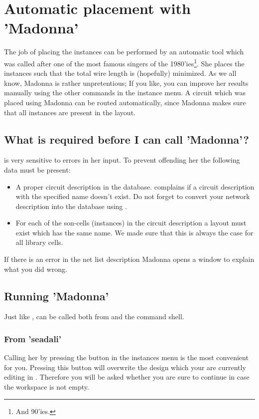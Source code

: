 
\chapter{Automatic placement with 'Madonna'}
\label{madonna}
The job of placing the instances can be performed by an automatic tool which
was called after one of the most famous singers of the 1980'ies\footnote{And
90'ies.}. She places the instances such that the total wire length is
(hopefully) minimized. As we all know, Madonna is rather unpretentious;
If you like, you can improve her results manually using the other commands in
the instance menu. A circuit which was placed using Madonna can be routed
automatically, since Madonna makes sure that all instances are present in the
layout.

\section{What is required before I can call 'Madonna'?}
 is very sensitive to errors in her input.
To prevent offending her the following data must be present:
\begin{itemize}
\item
A proper circuit description in the database. 
complains if a circuit description with the specified name
doesn't exist.
Do not forget to convert your
 network description into the database using .
\item
For each of the son-cells (instances) in the circuit description
a layout must exist which has the same name. We made sure that
this is always the case for all library cells.
\end{itemize}
If there is an error in the net list description Madonna opens a window to
explain what you did wrong.

\section{Running 'Madonna'} \label{s-run-madonna}
Just like ,  can be called both
from  and the command shell. 
\subsection{From 'seadali'}
Calling her
by pressing the button  in the instances
menu is the most convenient for you.
Pressing this button will overwrite the design which
your are currently editing in . Therefore you will be
asked whether you are sure to continue in case the workspace
is not empty.

